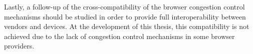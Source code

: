 Lastly, a follow-up of the cross-compatibility of the browser congestion control mechanisms should be studied in order to provide full interoperability between vendors and devices. At the development of this thesis, this compatibility is not achieved due to the lack of congestion control mechanisms in some browser providers.
